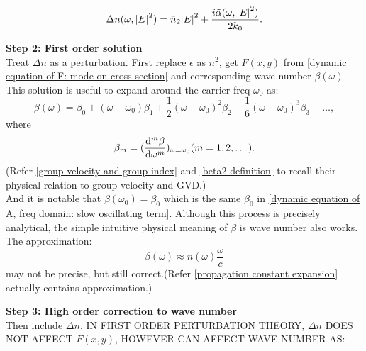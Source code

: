 \documentclass[12pt]{extarticle}
\numberwithin{equation}{section}
\numberwithin{figure}{section}
\numberwithin{table}{section}
\newcommand{\<}{\langle}
\renewcommand{\>}{\rangle}
\theoremstyle{definition}
\newcommand{\SubItem}[1]{
    {\setlength\itemindent{15pt} \item[-] #1}
}
\begin{document}
\begin{itemize}
{\begin{equation}
                    \Delta n(\omega, \abs{E}^2) = \Bar{n}_2\abs{E}^2+\frac{i\Tilde{\alpha}(\omega, \abs{E}^2)}{2k_0}.
                    \label{Delta n relation with abs E and alpha}
                \end{equation}
            }
            \SubItem{\textbf{Step 2: First order solution}\\
                Treat $\Delta n$ as a perturbation. First replace $\epsilon$ as $n^2$, get $F(x,y)$ from \autoref{dynamic equation of F: mode on cross section} and corresponding wave number $\beta(\omega)$. This solution is useful to expand around the carrier freq $\omega_0$ as:
                \begin{equation}
                    \beta(\omega) = \beta_0 + (\omega-\omega_0)\beta_1 + \frac{1}{2}(\omega-\omega_0)^2\beta_2 + \frac{1}{6}(\omega-\omega_0)^3\beta_3 + \dots,
                    \label{beta omega expands around omega 0}
                \end{equation}
                where
                \begin{equation}
                    \beta_m = (\dv[m]{\beta}{\omega})_{\omega=\omega_0}     (m=1,2,\dots).
                    \label{beta m expression as beta derivative}
                \end{equation}
                (Refer \autoref{group velocity and group index} and \autoref{beta2 definition} to recall their physical relation to group velocity and GVD.)\\
                And it is notable that $\beta(\omega_0)=\beta_0$ which is the same $\beta_0$ in \autoref{dynamic equation of A, freq domain: slow oscillating term}. Although this process is precisely analytical, the simple intuitive physical meaning of $\beta$ is wave number also works. The approximation:
                \begin{equation}
                    \beta(\omega) \approx n(\omega)\frac{\omega}{c}
                    \label{beta omega relation approx to n omega / c}
                \end{equation}
                may not be precise, but still correct.(Refer \autoref{propagation constant expansion} actually contains approximation.)
            }
            \SubItem{\textbf{Step 3: High order correction to wave number}\\
                Then include $\Delta n$. \MakeUppercase{In first order perturbation theory, } $\Delta n$ \MakeUppercase{does not affect }$F(x,y)$, \MakeUppercase{ however can affect wave number as:}
                \begin{equation}

\end{equation}}
\end{itemize}
\end{document}
